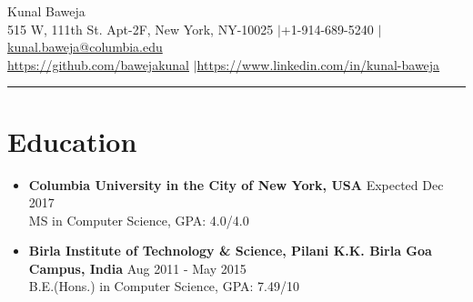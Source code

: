 \documentclass{article}
\def\name{Kunal Baweja}
\begin{document}
\begin{center}
{\huge \name}\\
515 W, 111th St. Apt-2F, New York, NY-10025 $|$\hspace{3pt}+1-914-689-5240 $|$\hspace{3pt}\href{mailto:kunal.baweja@columbia.edu}{kunal.baweja@columbia.edu}\\
\vspace{2pt}
\href{https://github.com/bawejakunal}{https://github.com/bawejakunal} $|$\hspace{3pt}\href{https://www.linkedin.com/in/kunal-baweja}{https://www.linkedin.com/in/kunal-baweja}
\end{center}

\hrule
\vspace{5pt}

\section*{Education}
\begin{itemize}
    \item \textbf{Columbia University in the City of New York, USA} {\hfill Expected Dec 2017}\\
    MS in Computer Science, GPA: 4.0/4.0
    
    \item \textbf{Birla Institute of Technology \& Science, Pilani K.K. Birla Goa Campus, India} {\hfill Aug 2011 - May 2015}\\
    B.E.(Hons.) in Computer Science, GPA: 7.49/10

\end{itemize}
\end{document}
